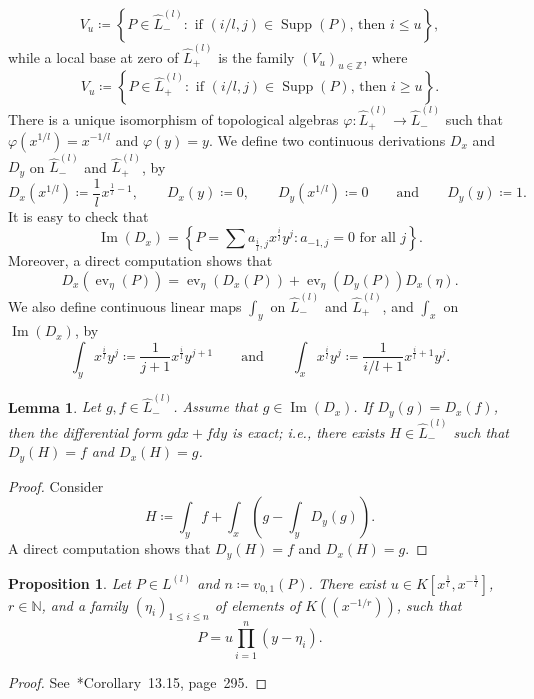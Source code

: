 \documentclass[reqno,a4paper]{amsart}
\newtheorem{lemma}[theorem]{Lemma}
\newtheorem{proposition}[theorem]{Proposition}
\theoremstyle{definition}
\theoremstyle{remark}
\DeclareMathOperator{\Supp}{Supp}
\DeclareMathOperator{\ev}{ev}
\DeclareMathOperator{\Ima}{Im}
\begin{document}
$$
V_u \coloneqq  \left\{P\in \hat L_-^{(l)}: \text{ if $(i/l,j)\in \Supp(P)$, then $i\le u$} \right\},
$$
while a local base at zero of $\hat L_+^{(l)}$ is the family $(V_u)_{u\in \mathds{Z}}$, where
$$
V_u \coloneqq  \left\{P\in \hat L_+^{(l)}: \text{ if $(i/l,j)\in \Supp(P)$, then $i\ge u$} \right\}.
$$
There is a unique isomorphism of topological algebras $\varphi\colon \hat L_+^{(l)}\to \hat L_-^{(l)}$ such that $\varphi(x^{1/l}) = x^{-1/l}$ and $\varphi(y) = y$. We define two continuous derivations $D_x$ and $D_y$ on $\hat L_-^{(l)}$ and $\hat L_+^{(l)}$, by
$$
D_x(x^{1/l})\coloneqq \frac 1l x^{\frac 1l -1},\qquad D_x(y)\coloneqq 0,\qquad D_y(x^{1/l})\coloneqq 0\qquad\text{and}\qquad D_y(y)\coloneqq 1.
$$
It is easy to check that
$$
\Ima(D_x)=\left\{P =\sum a_{\frac{i}{l},j} x^{\frac{i}{l}} y^j : a_{-1,j} = 0 \text{ for all } j\right\}.
$$
Moreover, a direct computation shows that
\begin{equation}\label{derivada total}
D_x(\ev_{\eta}(P))=\ev_{\eta}(D_x(P))+\ev_{\eta}(D_y(P))D_x(\eta).
\end{equation}
We also define continuous linear maps $\int_y$ on $\hat L_-^{(l)}$ and $\hat L_+^{(l)}$, and $\int_x$ on $\Ima(D_x)$, by
$$
\int_y x^{\frac{i}{l}} y^j\coloneqq \frac{1}{j+1}x^{\frac{i}{l}} y^{j+1}\qquad\text{and}\qquad \int_x x^{\frac{i}{l}} y^j\coloneqq \frac{1}{i/l+1}x^{\frac{i}{l}+1} y^j.
$$

\begin{lemma}\label{forma exacta}
Let $g, f\in \hat L_-^{(l)}$. Assume that $g\in\Ima(D_x)$. If $D_y(g)=D_x(f)$, then the differential form $gdx+fdy$ is exact; i.e., there exists $H\in \hat L_-^{(l)}$ such that $D_y(H)=f$ and $D_x(H)=g$.
\end{lemma}
\begin{proof}
Consider
$$
H\coloneqq \int_y f+\int_x\left(g- \int_y D_y(g)\right).
$$
A direct computation shows that $D_y(H)=f$ and $D_x(H)=g$.
\end{proof}

\begin{proposition}\label{puiseux} Let $P\in L^{(l)}$ and $n\coloneqq v_{0,1}(P)$. There exist $u\in K[x^{\frac 1l},x^{-\frac 1l}]$, $r\in\mathds{N}$, and a family $(\eta_i)_{1\le i\le n}$ of elements of $K((x^{-1/r}))$, such that
\begin{equation}\label{producto}
P=u \prod_{i=1}^{n}(y-\eta_i).
\end{equation}
\end{proposition}

\begin{proof} See~\cite{E}*{Corollary~13.15, page~295}.
\end{proof}
\end{document}
